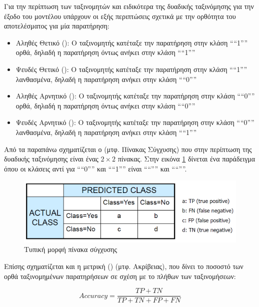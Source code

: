 Για την περίπτωση των ταξινομητών και ειδικότερα της δυαδικής ταξινόμησης για την έξοδο
του μοντέλου υπάρχουν οι εξής περιπτώσεις σχετικά με την ορθότητα του αποτελέσματος για
μία παρατήρηση:

\begin{itemize}
    \item Αληθές Θετικό (): Ο ταξινομητής κατέταξε την παρατήρηση
    στην κλάση ````1'''' ορθά, δηλαδή η παρατήρηση όντως ανήκει στην κλάση ````1''''
    \item Ψευδές Θετικό (): Ο ταξινομητής κατέταξε την παρατήρηση
    στην κλάση ````1'''' λανθασμένα, δηλαδή η παρατήρηση ανήκει στην κλάση ````0''''
    \item Αληθές Αρνητικό (): Ο ταξινομητής κατέταξε την παρατήρηση
    στην κλάση ````0'''' ορθά, δηλαδή η παρατήρηση όντως ανήκει στην κλάση ````0''''
    \item Ψευδές Αρνητικό (): Ο ταξινομητής κατέταξε την παρατήρηση
    στην κλάση ````0'''' λανθασμένα, δηλαδή η παρατήρηση ανήκει στην κλάση ````1''''
\end{itemize}

Από τα παραπάνω σχηματίζεται ο  (μτφ. Πίνακας Σύγχυσης) που στην περίπτωση
της δυαδικής ταξινόμησης είναι ένας \(2 \times 2\) πίνακας. Στην εικόνα \ref{figure1.5} 
δίνεται ένα παράδειγμα όπου οι κλάσεις αντί για ````0'''' και ````1'''' είναι ````'''' και ````''''.

\begin{figure}[!ht] \centering
\includegraphics[scale = 0.6]{static/figures/conf_matrix.png} 
\caption{Τυπική μορφή πίνακα σύγχυσης \cite{DataMining}}
\label{figure1.5}
\end{figure}

Επίσης σχηματίζεται και η μετρική () (μτφ. Ακρίβειας), που δίνει το ποσοστό των
ορθά ταξινομημένων παρατηρήσεων σε σχέση με το πλήθων των ταξινομήσεων:

\begin{equation}
    Accuracy = \frac{TP + TN}{TP + TN + FP + FN}
\end{equation}

